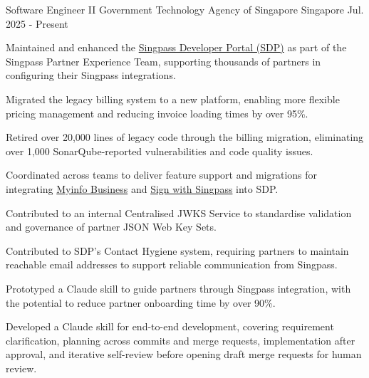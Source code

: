 

\begin{cventries}

  \cventry
    {Software Engineer II} %
    {Government Technology Agency of Singapore} %
    {Singapore} %
    {Jul. 2025 - Present} %
    {
      \begin{cvitems}
        \item {Maintained and enhanced the \href{https://developer.singpass.gov.sg/}{Singpass Developer Portal (SDP)} as part of the Singpass Partner Experience Team, supporting thousands of partners in configuring their Singpass integrations.}
        \item {Migrated the legacy billing system to a new platform, enabling more flexible pricing management and reducing invoice loading times by over 95\%.}
        \item {Retired over 20,000 lines of legacy code through the billing migration, eliminating over 1,000 SonarQube-reported vulnerabilities and code quality issues.}
        \item {Coordinated across teams to deliver feature support and migrations for integrating \href{https://docs.corppass.gov.sg/products/myinfo-business}{Myinfo Business} and \href{https://docs.developer.singpass.gov.sg/docs/singpass-developer-docs/sign-with-singpass}{Sign with Singpass} into SDP.}
        \item {Contributed to an internal Centralised JWKS Service to standardise validation and governance of partner JSON Web Key Sets.}
        \item {Contributed to SDP's Contact Hygiene system, requiring partners to maintain reachable email addresses to support reliable communication from Singpass.}
        \item {Prototyped a Claude skill to guide partners through Singpass integration, with the potential to reduce partner onboarding time by over 90\%.}
        \item {Developed a Claude skill for end-to-end development, covering requirement clarification, planning across commits and merge requests, implementation after approval, and iterative self-review before opening draft merge requests for human review.}
      \end{cvitems}
    }


\end{cventries}
